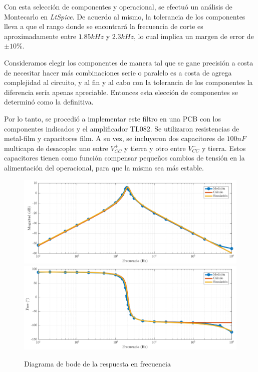 \documentclass[../../tc_tp3_main.tex]{subfiles}
\begin{document}
Con esta selecci\'on de componentes y operacional, se efectu\'o un an\'alisis de Montecarlo en \textit{LtSpice}. De acuerdo al mismo, la tolerancia de los componentes lleva a que el rango donde se encontrar\'a la frecuencia de corte es aproximadamente entre $1.85kHz$ y $2.3kHz$, lo cual implica un margen de error de $\pm 10\%$. \par

Consideramos elegir los componentes de manera tal que se gane precisi\'on a costa de necesitar hacer m\'as combinaciones serie o paralelo es a costa de agrega complejidad al circuito, y al fin y al cabo con la tolerancia de los componentes la diferencia ser\'ia apenas apreciable. Entonces esta elecci\'on de componentes se determin\'o como la definitiva.\par

Por lo tanto, se procedi\'o a implementar este filtro en una PCB con los componentes indicados y el amplificador TL082. Se utilizaron resistencias de metal-film y capacitores film. A su vez, se incluyeron dos capacitores de $100nF$ multicapa de desacople: uno entre $V_{CC}^+$ y tierra y otro entre $V_{CC}^-$ y tierra. Estos capacitores tienen como funci\'on compensar peque\~nos cambios de tensi\'on en la alimentaci\'on del operacional, para que la misma sea m\'as estable.

\begin{figure}[t]
	\centering
  	\includegraphics[scale = 0.5]{imagenes/tc_tp3_ej1_hf_mag.png}
  	\includegraphics[scale = 0.5]{imagenes/tc_tp3_ej1_hf_fase.png}
  	\caption{Diagrama de bode de la respuesta en frecuencia}
  	\label{fig:1-rtafrec}
\end{figure}
\end{document}
